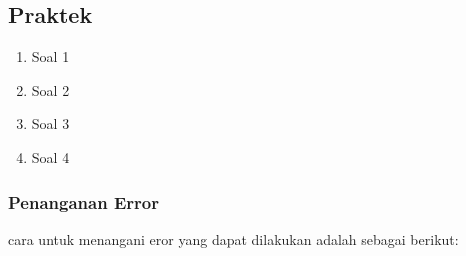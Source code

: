 \subsection{Praktek}
\begin{enumerate}
\item Soal 1


\item Soal 2


\item Soal 3


\item Soal 4


\end{enumerate}

\subsubsection{Penanganan Error}
cara untuk menangani eror yang dapat dilakukan adalah sebagai berikut:




